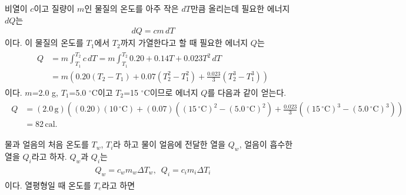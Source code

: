 \documentclass[floatfix,nofootinbib,superscriptaddress,fleqn]{revtex4-2}
\begin{document}
\vspace{1.cm}

비열이 $c$이고 질량이 $m$인 물질의 온도를 아주 작은 $dT$만큼 올리는데 필요한 에너지 $dQ$는
\begin{align}
 dQ = cm\,d T
\end{align}
이다. 이 물질의 온도를 $T_1$에서 $T_2$까지 가열한다고 할 때 필요한 에너지 $Q$는
\begin{align}
  \begin{split}
    Q &= m\int^{T_2}_{T_1}c\,dT
    = m \int^{T_2}_{T_1}0.20 +0.14T+0.023T^2\,dT  \\
    &= m\left( 0.20\left(T_2-T_1\right)+0.07\left(T_2^2-T_1^2\right)
    +\frac{0.023}{3}\left(T_2^3-T_1^3\right) \right)
  \end{split}
\end{align}
이다. $m$=2.0 g, $T_1$=5.0 $\mathrm{^\circ C}$이고 $T_2$=15 $\mathrm{^\circ C}$이므로
에너지 $Q$를 다음과 같이 얻는다.
\begin{align}
  \begin{split}
    Q &= (2.0\,\mathrm{g})\left(  
      (0.20)(10\,\mathrm{^\circ C})+(0.07)\left(
        (15\,\mathrm{^\circ C})^2-  
      (5.0\,\mathrm{^\circ C})^2\right)
      +\frac{0.023}{3}\left((15\,\mathrm{^\circ C})^3-  
      (5.0\,\mathrm{^\circ C})^3\right)
      \right) \\
      &= 82\,\mathrm{cal}.
    \end{split}
\end{align}
\vspace{1.cm}

물과 얼음의 처음 온도를 $T_w$, $T_i$라 하고
물이 얼음에 전달한 열을 $Q_{w}$, 얼음이 흡수한 열을 $Q_{i}$라고 하자.
$Q_{w}$과 $Q_{i}$는
\begin{align}
  \begin{split}
    Q_{w}  = c_{w}m_{w}\Delta T_w ,\,\,\,Q_{i} = c_{i}m_{i}\Delta T_i
  \end{split}
\end{align}
이다. 열평형일 때 온도를 $T_e$라고 하면
\end{document}
